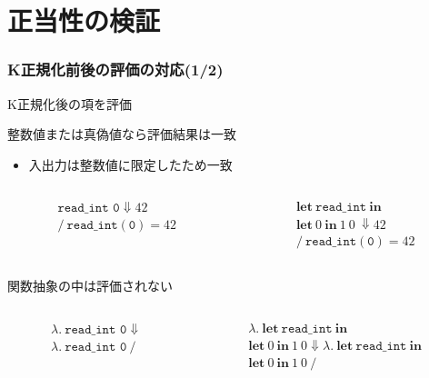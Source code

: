 \documentclass[dvipdfmx,cjk,xcolor=dvipsnames,envcountsect,notheorems,12pt]{beamer}
\theoremstyle{definition}
\newcommand{\keyword}[1]{\mathbf{#1}}
\newcommand{\LET}{\keyword{let}}
\newcommand{\IN}{\keyword{in}}
\begin{document}
\section{正当性の検証}

\begin{frame}
	\frametitle{K正規化前後の評価の対応(1/2)}
	{\LARGE K正規化後の項を評価}

	\vfill

	\Large 整数値または真偽値なら評価結果は一致
	\begin{itemize}
		\item 入出力は整数値に限定したため一致
	\end{itemize}
	{\normalsize \begin{columns}
		\begin{column}{0.4\textwidth}
			\[\begin{array}{l}
				\texttt{read\_int 0}\Downarrow 42 \\
				/~\texttt{read\_int}(\texttt{0})=42
			\end{array}\]
		\end{column}
		\begin{column}{0.4\textwidth}
			\[ 
				\begin{array}{l}
					\LET~\texttt{read\_int}~\IN \\
					\LET~0~\IN~1~0~\Downarrow 42 \\
					/~\texttt{read\_int}(\texttt{0})=42
				\end{array}
			\]
		\end{column}
	\end{columns}}

	\vfill

	関数抽象の中は評価されない
	{\normalsize \begin{columns}
		\begin{column}{0.4\textwidth}
			\[\begin{array}{l}
				\lambda.~\texttt{read\_int 0} \Downarrow \\
				\lambda.~\texttt{read\_int 0}~/
			\end{array} \]
		\end{column}
		\begin{column}{0.6\textwidth}
			\[ \begin{array}{l}
				\lambda.~\LET~\texttt{read\_int}~\IN \\
				\LET~0~\IN~1~0\Downarrow
				\lambda.~\LET~\texttt{read\_int}~\IN \\
				\LET~0~\IN~1~0~/ \\
			\end{array} \]
		\end{column}
	\end{columns}}
\end{frame}
\end{document}
